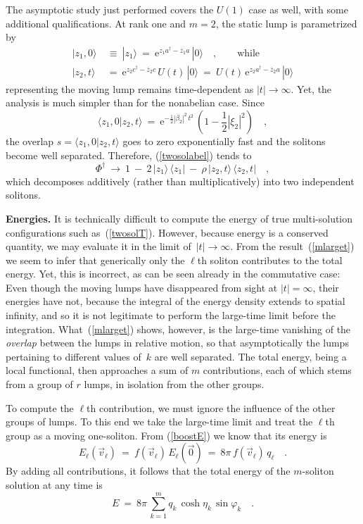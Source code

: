 \documentclass[a4paper,11pt]{article}
\numberwithin{equation}{section}
\def\b{\beta}
\def\e{\mbox{e}}
\def\sfrac#1#2{{\textstyle\frac{#1}{#2}}}
\newcommand{\adag}{a^{\dagger}}
\newcommand{\cdag}{c^{\dagger}}
\newcommand{\zb}{\overline{z}}
\begin{document}
The asymptotic study just performed covers the $U(1)$ case as well,
with some additional qualifications.
At rank one and $m{=}2$, the static lump is parametrized by
\begin{align}
|z_1,0\rangle\ &\equiv\ |z_1\rangle\ =\ \e^{z_1 \adag-\zb_1 a}\,|0\rangle
\quad,\qquad\textrm{while} \nonumber\\[6pt]
|z_2,t\rangle\ &=\ \e^{z_2 \cdag-\zb_2 c}\,U(t)\,|0\rangle\ =\
U(t)\,\e^{z_2 \adag-\zb_2 a}\,|0\rangle
\end{align}
representing the moving lump remains time-dependent as $|t|\to\infty$.
Yet, the analysis is much simpler than for the nonabelian case.
Since~\cite{perel}
\begin{equation}
\langle z_1,0|z_2,t\rangle\ =\
\e^{-\frac12|\b_2|^2\,t^2}\,(1{-}\sfrac12|\xi_2|^2) \quad,
\end{equation}
the overlap $s=\langle z_1,0|z_2,t\rangle$ goes to zero exponentially fast
and the solitons become well separated.
Therefore, (\ref{twosolabel}) tends to
\begin{equation}
\Phi^\dagger\ \to\ 1\ -\
2\,|z_1\rangle\,\langle z_1|\ -\ \rho\,|z_2,t\rangle\,\langle z_2,t| \quad,
\end{equation}
which decomposes additively (rather than multiplicatively) into two
independent solitons.

\noindent
{\bf Energies.}
It is technically difficult to compute the energy
of true multi-solution configurations such as~(\ref{twosolT}).
However, because energy is a conserved quantity, we may evaluate it in
the limit of~$|t|\to\infty$.
{}From the result~(\ref{mlarget}) we seem to infer that generically
only the $\ell$th soliton contributes to the total energy.
Yet, this is incorrect, as can be seen already in the
commutative case: Even though the moving lumps have disappeared from sight
at $|t|=\infty$, their energies have not, because the integral of the energy
density extends to spatial infinity, and so it is not legitimate to
perform the large-time limit before the integration.
What~(\ref{mlarget}) shows, however, is the large-time vanishing of the
{\it overlap\/} between the lumps in relative motion, so that asymptotically
the lumps pertaining to different values of~$k$ are well separated.
The total energy, being a local functional, then approaches a sum of $m$
contributions, each of which stems from a group of $r$ lumps, in isolation
from the other groups.

To compute the $\ell$th contribution, we must ignore the influence of the
other groups of lumps. To this end we take the large-time limit and treat
the $\ell$th group as a moving one-soliton.
{}From (\ref{boostE}) we know that its energy is
\begin{equation} \label{energyell}
E_\ell(\vec v_\ell)\ =\ f(\vec v_\ell)\,E_\ell(\vec 0)\ =\
8\pi\, f(\vec v_\ell)\,q_\ell \quad.
\end{equation}
By adding all contributions,
it follows that the total energy of the $m$-soliton solution at any time is
\begin{equation}
E\ =\ 8\pi\,\sum_{k=1}^m
q_k\,\cosh\eta_k\,\sin\varphi_k  \quad.
\end{equation}
\end{document}
